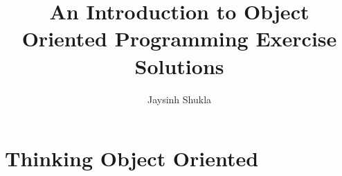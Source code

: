 \documentclass{book}
\title{An Introduction to Object Oriented Programming Exercise Solutions}
\author{Jaysinh Shukla}
\begin{document}
  \maketitle

  \chapter{Thinking Object Oriented}
  
\end{document}
